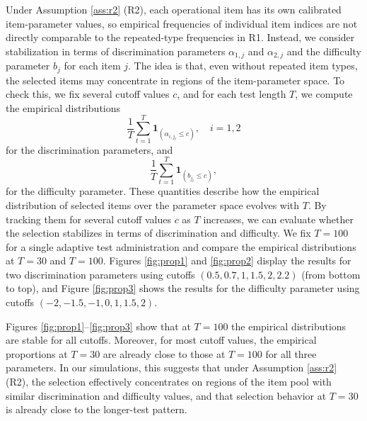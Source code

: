 \documentclass[12pt]{article}
\begin{document}
Under Assumption \ref{ass:r2} (R2), each operational item has its own calibrated item-parameter values, so empirical frequencies of individual item indices are not directly comparable to the repeated-type frequencies in R1. Instead, we consider stabilization in terms of discrimination parameters $\alpha_{1,j}$ and $\alpha_{2,j}$ and the difficulty parameter $b_j$ for each item $j$. The idea is that, even without repeated item types, the selected items may concentrate in regions of the item-parameter space. To check this, we fix several cutoff values $c$, and for each test length $T$, we compute the empirical distributions 
\begin{equation} \label{e:emp_dist1}
\frac{1}{T} \sum_{t=1}^{T} \mathbf{1}_{(\alpha_{i, j_t} \leq c)}, \quad i = 1,2
\end{equation} 
for the discrimination parameters, and 
\begin{equation} \label{e:emp_dist2}
\frac{1}{T} \sum_{t=1}^{T} \mathbf{1}_{(b_{j_t} \leq c)},
\end{equation} 
for the difficulty parameter. These quantities describe how the empirical distribution of selected items over the parameter space evolves with $T$. By tracking them for several cutoff values $c$ as $T$ increases, we can evaluate whether the selection stabilizes in terms of discrimination and difficulty. We fix $T = 100$ for a single adaptive test administration and compare the empirical distributions at $T = 30$ and $T = 100$. Figures \ref{fig:prop1} and \ref{fig:prop2} display the results for two discrimination parameters using cutoffs $(0.5, 0.7, 1, 1.5, 2, 2.2)$ (from bottom to top), and Figure \ref{fig:prop3} shows the results for the difficulty parameter using cutoffs $(-2, -1.5, -1, 0, 1, 1.5, 2)$.

Figures \ref{fig:prop1}--\ref{fig:prop3} show that at $T = 100$ the empirical distributions are stable for all cutoffs. Moreover, for most cutoff values, the empirical proportions at $T = 30$ are already close to those at $T = 100$ for all three parameters. In our simulations, this suggests that under Assumption \ref{ass:r2} (R2), the selection effectively concentrates on regions of the item pool with similar discrimination and difficulty values, and that selection behavior at $T = 30$ is already close to the longer-test pattern.
\end{document}
